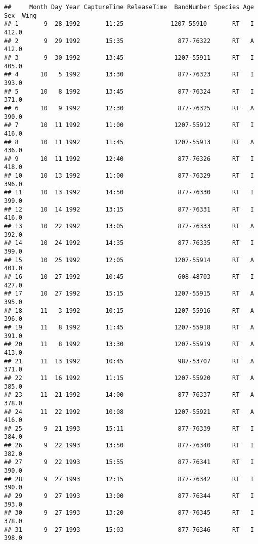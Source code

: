 \documentclass[
]{article}
\begin{document}
\begin{verbatim}
##     Month Day Year CaptureTime ReleaseTime  BandNumber Species Age Sex  Wing
## 1       9  28 1992       11:25             1207-55910       RT   I     412.0
## 2       9  29 1992       15:35               877-76322      RT   A     412.0
## 3       9  30 1992       13:45              1207-55911      RT   I     405.0
## 4      10   5 1992       13:30               877-76323      RT   I     393.0
## 5      10   8 1992       13:45               877-76324      RT   I     371.0
## 6      10   9 1992       12:30               877-76325      RT   A     390.0
## 7      10  11 1992       11:00              1207-55912      RT   I     416.0
## 8      10  11 1992       11:45              1207-55913      RT   A     436.0
## 9      10  11 1992       12:40               877-76326      RT   I     418.0
## 10     10  13 1992       11:00               877-76329      RT   I     396.0
## 11     10  13 1992       14:50               877-76330      RT   I     399.0
## 12     10  14 1992       13:15               877-76331      RT   I     416.0
## 13     10  22 1992       13:05               877-76333      RT   A     392.0
## 14     10  24 1992       14:35               877-76335      RT   I     399.0
## 15     10  25 1992       12:05              1207-55914      RT   A     401.0
## 16     10  27 1992       10:45               608-48703      RT   I     427.0
## 17     10  27 1992       15:15              1207-55915      RT   A     395.0
## 18     11   3 1992       10:15              1207-55916      RT   A     396.0
## 19     11   8 1992       11:45              1207-55918      RT   A     391.0
## 20     11   8 1992       13:30              1207-55919      RT   A     413.0
## 21     11  13 1992       10:45               987-53707      RT   A     371.0
## 22     11  16 1992       11:15              1207-55920      RT   A     385.0
## 23     11  21 1992       14:00               877-76337      RT   A     378.0
## 24     11  22 1992       10:08              1207-55921      RT   A     416.0
## 25      9  21 1993       15:11               877-76339      RT   I     384.0
## 26      9  22 1993       13:50               877-76340      RT   I     382.0
## 27      9  22 1993       15:55               877-76341      RT   I     390.0
## 28      9  27 1993       12:15               877-76342      RT   I     390.0
## 29      9  27 1993       13:00               877-76344      RT   I     393.0
## 30      9  27 1993       13:20               877-76345      RT   I     378.0
## 31      9  27 1993       15:03               877-76346      RT   I     398.0

\end{verbatim}
\end{document}
